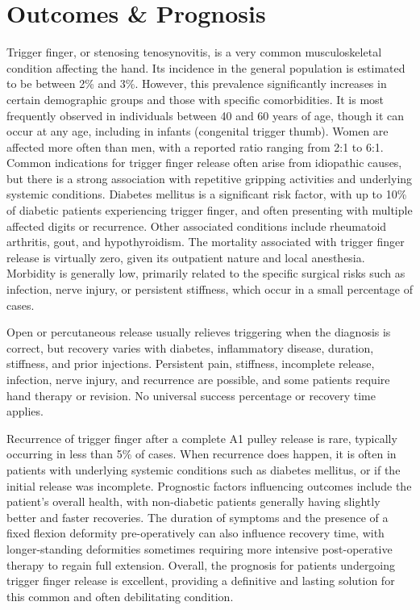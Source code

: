 \section*{Outcomes \& Prognosis}
Trigger finger, or stenosing tenosynovitis, is a very common musculoskeletal condition affecting the hand. Its incidence in the general population is estimated to be between 2\% and 3\%. However, this prevalence significantly increases in certain demographic groups and those with specific comorbidities. It is most frequently observed in individuals between 40 and 60 years of age, though it can occur at any age, including in infants (congenital trigger thumb). Women are affected more often than men, with a reported ratio ranging from 2:1 to 6:1. Common indications for trigger finger release often arise from idiopathic causes, but there is a strong association with repetitive gripping activities and underlying systemic conditions. Diabetes mellitus is a significant risk factor, with up to 10\% of diabetic patients experiencing trigger finger, and often presenting with multiple affected digits or recurrence. Other associated conditions include rheumatoid arthritis, gout, and hypothyroidism. The mortality associated with trigger finger release is virtually zero, given its outpatient nature and local anesthesia. Morbidity is generally low, primarily related to the specific surgical risks such as infection, nerve injury, or persistent stiffness, which occur in a small percentage of cases.

Open or percutaneous release usually relieves triggering when the diagnosis is correct, but recovery varies with diabetes, inflammatory disease, duration, stiffness, and prior injections. Persistent pain, stiffness, incomplete release, infection, nerve injury, and recurrence are possible, and some patients require hand therapy or revision. No universal success percentage or recovery time applies.

Recurrence of trigger finger after a complete A1 pulley release is rare, typically occurring in less than 5\% of cases. When recurrence does happen, it is often in patients with underlying systemic conditions such as diabetes mellitus, or if the initial release was incomplete. Prognostic factors influencing outcomes include the patient's overall health, with non-diabetic patients generally having slightly better and faster recoveries. The duration of symptoms and the presence of a fixed flexion deformity pre-operatively can also influence recovery time, with longer-standing deformities sometimes requiring more intensive post-operative therapy to regain full extension. Overall, the prognosis for patients undergoing trigger finger release is excellent, providing a definitive and lasting solution for this common and often debilitating condition.


